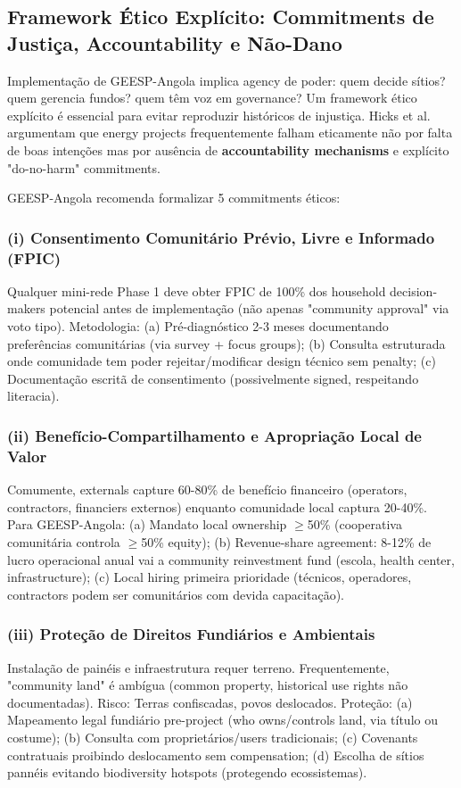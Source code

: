 \documentclass[12pt, a4paper]{article}
\begin{document}
\subsection{Framework Ético Explícito: Commitments de Justiça, Accountability e Não-Dano}

Implementação de GEESP-Angola implica agency de poder: quem decide sítios? quem gerencia fundos? quem têm voz em governance? Um framework ético explícito é essencial para evitar reproduzir históricos de injustiça. Hicks et al.~\citep{Hicks2025} argumentam que energy projects frequentemente falham eticamente não por falta de boas intenções mas por ausência de \textbf{accountability mechanisms} e explícito "do-no-harm" commitments.

GEESP-Angola recomenda formalizar 5 commitments éticos:

\subsubsection{(i) Consentimento Comunitário Prévio, Livre e Informado (FPIC)}
Qualquer mini-rede Phase 1 deve obter FPIC de 100\% dos household decision-makers potencial antes de implementação (não apenas "community approval" via voto tipo). Metodologia: (a) Pré-diagnóstico 2-3 meses documentando preferências comunitárias (via survey + focus groups); (b) Consulta estruturada onde comunidade tem poder rejeitar/modificar design técnico sem penalty; (c) Documentação escritã de consentimento (possivelmente signed, respeitando literacia).

\subsubsection{(ii) Benefício-Compartilhamento e Apropriação Local de Valor}
Comumente, externals capture 60-80\% de benefício financeiro (operators, contractors, financiers externos) enquanto comunidade local captura 20-40\%. Para GEESP-Angola: (a) Mandato local ownership $\geq$50\% (cooperativa comunitária controla $\geq$50\% equity); (b) Revenue-share agreement: 8-12\% de lucro operacional anual vai a community reinvestment fund (escola, health center, infrastructure); (c) Local hiring primeira prioridade (técnicos, operadores, contractors podem ser comunitários com devida capacitação).

\subsubsection{(iii) Proteção de Direitos Fundiários e Ambientais}
Instalação de painéis e infraestrutura requer terreno. Frequentemente, "community land" é ambígua (common property, historical use rights não documentadas). Risco: Terras confiscadas, povos deslocados. Proteção: (a) Mapeamento legal fundiário pre-project (who owns/controls land, via título ou costume); (b) Consulta com proprietários/users tradicionais; (c) Covenants contratuais proibindo deslocamento sem compensation; (d) Escolha de sítios pannéis evitando biodiversity hotspots (protegendo ecossistemas).
\end{document}
